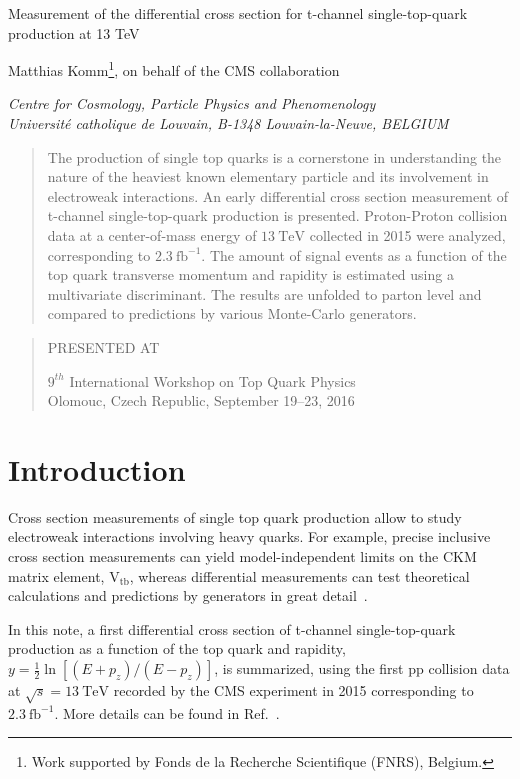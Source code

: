 \documentclass[12pt]{article}
\newcommand\pubnumber{}%
\newcommand\pubdate{\today}
\def\institute{Centre for Cosmology, Particle Physics and Phenomenology\\
Universit\'e catholique de Louvain, B-1348 Louvain-la-Neuve, BELGIUM}
\def\support{\footnote{Work supported by Fonds de la Recherche Scientifique (FNRS), Belgium.}}
\def\Title#1{\begin{center} {\Large #1 } \end{center}}
\def\Author#1{\begin{center}{ \sc #1} \end{center}}
\def\Address#1{\begin{center}{ \it #1} \end{center}}
\newcommand\pubblock{\rightline{\begin{tabular}{l} \pubnumber\\
         \pubdate  \end{tabular}}}
\newenvironment{Abstract}{\begin{quotation}  }{\end{quotation}}
\newenvironment{Presented}{\begin{quotation} \begin{center} 
             PRESENTED AT\end{center}\bigskip 
      \begin{center}\begin{large}}{\end{large}\end{center} \end{quotation}}
\begin{document}
\begin{titlepage}
\pubblock

\vfill
\Title{Measurement of the differential cross section for t-channel single-top-quark production at 13 TeV}
\vfill
\Author{ Matthias Komm\support, on behalf of the CMS collaboration}
\Address{\institute}
\vfill
\begin{Abstract}
The production of single top quarks is a cornerstone in understanding the nature of the heaviest known elementary particle and its involvement in electroweak interactions. An early differential cross section measurement of t-channel single-top-quark production is presented. Proton-Proton collision data at a center-of-mass energy of $13~\mathrm{TeV}$ collected in 2015 were analyzed, corresponding to $2.3~\mathrm{fb}^{-1}$. The amount of signal events as a function of the top quark transverse momentum and rapidity is estimated using a multivariate discriminant. The results are unfolded to parton level and compared to predictions by various Monte-Carlo generators.
\end{Abstract}
\vfill
\begin{Presented}
$9^{th}$ International Workshop on Top Quark Physics\\
Olomouc, Czech Republic,  September 19--23, 2016
\end{Presented}
\vfill
\end{titlepage}
\def\thefootnote{\fnsymbol{footnote}}
\setcounter{footnote}{0}
%

\section{Introduction}

Cross section measurements of single top quark production allow to study electroweak interactions involving heavy quarks. For example, precise inclusive cross section measurements can yield model-independent limits on the CKM matrix element, $\mathrm{V}_\mathrm{tb}$, whereas differential measurements can test theoretical calculations and predictions by generators in great detail~\cite{TOP-16-003,TOP-14-004}.

In this note, a first differential cross section of t-channel single-top-quark production as a function of the top quark \pt and rapidity, $y=\frac{1}{2}\ln[(E+p_{z})/(E-p_{z})]$, is summarized, using the first pp collision data at $\sqrt{s}=13~\mathrm{TeV}$ recorded by the CMS experiment in 2015 corresponding to $2.3~\mathrm{fb}^{-1}$. More details can be found in Ref.~\cite{TOP-16-004}.
\end{document}
